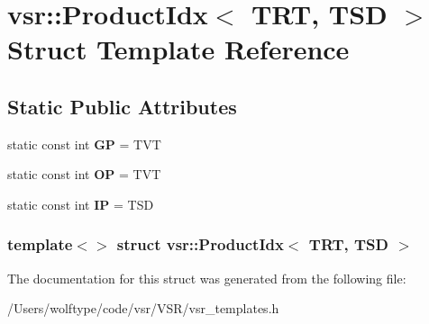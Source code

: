 \hypertarget{structvsr_1_1_product_idx_3_01_t_r_t_00_01_t_s_d_01_4}{\section{vsr\-:\-:Product\-Idx$<$ T\-R\-T, T\-S\-D $>$ Struct Template Reference}
\label{structvsr_1_1_product_idx_3_01_t_r_t_00_01_t_s_d_01_4}
}
\subsection*{Static Public Attributes}
\begin{DoxyCompactItemize}
\item 
\hypertarget{structvsr_1_1_product_idx_3_01_t_r_t_00_01_t_s_d_01_4_a9421414b5a1a9003443faf6fe42dcd9a}{static const int {\bfseries G\-P} = T\-V\-T}\label{structvsr_1_1_product_idx_3_01_t_r_t_00_01_t_s_d_01_4_a9421414b5a1a9003443faf6fe42dcd9a}

\item 
\hypertarget{structvsr_1_1_product_idx_3_01_t_r_t_00_01_t_s_d_01_4_ace3f6f2ef9f902954909a1c287caaa68}{static const int {\bfseries O\-P} = T\-V\-T}\label{structvsr_1_1_product_idx_3_01_t_r_t_00_01_t_s_d_01_4_ace3f6f2ef9f902954909a1c287caaa68}

\item 
\hypertarget{structvsr_1_1_product_idx_3_01_t_r_t_00_01_t_s_d_01_4_aef4b6769ac75fb29a976d6e0f09a9ef2}{static const int {\bfseries I\-P} = T\-S\-D}\label{structvsr_1_1_product_idx_3_01_t_r_t_00_01_t_s_d_01_4_aef4b6769ac75fb29a976d6e0f09a9ef2}

\end{DoxyCompactItemize}
\subsubsection*{template$<$$>$ struct vsr\-::\-Product\-Idx$<$ T\-R\-T, T\-S\-D $>$}



The documentation for this struct was generated from the following file\-:\begin{DoxyCompactItemize}
\item 
/\-Users/wolftype/code/vsr/\-V\-S\-R/vsr\-\_\-templates.\-h\end{DoxyCompactItemize}
